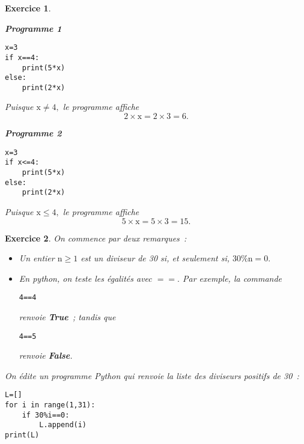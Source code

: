 \documentclass[10pt]{article}
\newtheorem{exo}{Exercice}
\begin{document}
\begin{exo}

~{}

\setlength{\columnseprule}{1pt}

\begin{multicols}{2}

\begin{center}\textbf{Programme 1}\end{center}

\begin{lstlisting}
x=3
if x==4:
	print(5*x)
else:
	print(2*x)
\end{lstlisting}

\medskip

Puisque $\text{x}\not=4,$ le programme affiche
\[2\times \text{x}=2\times 3=6.\]

\begin{center}\textbf{Programme 2}\end{center}

\begin{lstlisting}
x=3
if x<=4:
	print(5*x)
else:
	print(2*x)
\end{lstlisting}

\medskip

Puisque $\text{x}\leq 4,$ le programme affiche
\[5\times \text{x}=5\times 3=15.\]

\end{multicols}

\end{exo}

\begin{exo}



On commence par deux remarques~:

\begin{itemize}
\item[\textbullet] Un entier $\text{n}\geq 1$ est un diviseur de 30 si, et seulement si, $30\%\text{n}=0.$
\item[\textbullet] En python, on teste les égalités avec $==.$ Par exemple, la commande \begin{lstlisting}
4==4
\end{lstlisting} renvoie \textbf{True}~; tandis que
\begin{lstlisting}
4==5
\end{lstlisting} renvoie \textbf{False}.
\end{itemize}

\medskip

On édite un programme Python qui renvoie la liste des diviseurs positifs de 30~:

\medskip

\begin{lstlisting}
L=[]
for i in range(1,31):
	if 30%i==0:
		L.append(i)
print(L)
\end{lstlisting}



\end{exo}
\end{document}
